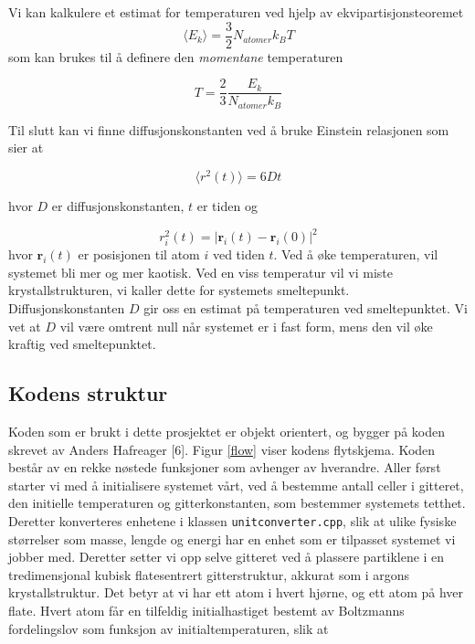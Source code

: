 \documentclass[paper=a4, fontsize=11pt]{scrartcl} %
\numberwithin{equation}{section} %
\numberwithin{figure}{section} %
\numberwithin{table}{section} %
\begin{document}
Vi kan kalkulere et estimat for temperaturen ved hjelp av ekvipartisjonsteoremet 
\begin{equation}
\langle E_k \rangle = \frac{3}{2}N_{atomer} k_B T
\end{equation}
som kan brukes til å definere den \textit{momentane} temperaturen

\begin{equation}
T = \frac{2}{3}\frac{E_k}{N_{atomer} k_B}
\end{equation}

Til slutt kan vi finne diffusjonskonstanten ved å bruke Einstein relasjonen som sier at

\begin{equation}
\langle r^2(t) \rangle = 6 D t
\end{equation}

hvor $D$ er diffusjonskonstanten, $t$ er tiden og

\begin{equation}
r_i^2 (t) = | \textbf{r}_i (t) - \textbf{r}_i (0) |^2
\end{equation} 
hvor $\textbf{r}_i (t)$ er posisjonen til atom $i$ ved tiden $t$. Ved å øke temperaturen, vil systemet bli mer og mer kaotisk. Ved en viss temperatur vil vi miste krystallstrukturen, vi kaller dette for systemets smeltepunkt. Diffusjonskonstanten $D$ gir oss en estimat på temperaturen ved smeltepunktet. Vi vet at $D$ vil være omtrent null når systemet er i fast form, mens den vil øke kraftig ved smeltepunktet.\\



\subsection{Kodens struktur}
Koden som er brukt i dette prosjektet er objekt orientert, og bygger på koden skrevet av Anders Hafreager [6]. Figur \ref{flow} viser kodens flytskjema. Koden består av en rekke nøstede funksjoner som avhenger av hverandre. Aller først starter vi med å initialisere systemet vårt, ved å bestemme antall celler i gitteret, den initielle temperaturen og gitterkonstanten, som bestemmer systemets tetthet. Deretter konverteres enhetene i klassen \texttt{unitconverter.cpp}, slik at ulike fysiske størrelser som masse, lengde og energi har en enhet som er tilpasset systemet vi jobber med. Deretter setter vi opp selve gitteret ved å plassere partiklene i en tredimensjonal kubisk flatesentrert gitterstruktur, akkurat som i argons krystallstruktur. Det betyr at vi har ett atom i hvert hjørne, og ett atom på hver flate. Hvert atom får en tilfeldig initialhastiget bestemt av Boltzmanns fordelingslov som funksjon av initialtemperaturen, slik at 
\end{document}
